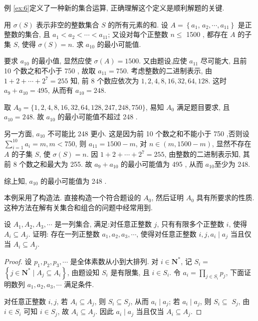 \begin{note}
	例 \ref{ex:6}定义了一种新的集合运算, 正确理解这个定义是顺利解题的关键.
\end{note}

\begin{example}
	用 $\sigma(S)$ 表示非空的整数集合 $S$ 的所有元素的和. 设 $A=\left\{a_{1}\right.$, $\left.a_{2}, \cdots, a_{11}\right\}$ 是正整数的集合, 且 $a_{1}<a_{2}<\cdots<a_{11}$; 又设对每个正整数 $n \leqslant$ 1500 , 都存在 $A$ 的子集 $S$, 使得 $\sigma(S)=n$. 求 $a_{10}$ 的最小可能值.
\end{example}

\begin{analysis}
	要求 $a_{10}$ 的最小值, 显然应使 $\sigma(A)=1500$. 又由题设,应使 $a_{11}$ 尽可能大, 且前 10 个数之和不小于 750 , 故取 $a_{11}=750$. 考虑整数的二进制表示, 由 $1+2+\cdots+2^{7}=255$ 知, 前 8 个数应依次为 $1 ,  2 ,  4 ,  8 ,  16 ,  32 ,  64 ,  128$. 这时 $a_{9}+a_{10}=495$, 从而有 $a_{10}=248$.
\end{analysis}

\begin{solution}
	取 $A_{0}=\{1,2,4,8,16,32,64,128,247,248,750\}$, 易知 $A_{0}$ 满足题目要求, 且 $a_{10}=248$. 故 $a_{10}$ 的最小可能值不超过 248 .

	另一方面, $a_{10}$ 不可能比 248 更小. 这是因为前 10 个数之和不能小于 750 ,否则设 $\sum_{i=1}^{10} a_{i}=m, m<750$, 则 $a_{11}=1500-m$, 对 $n \in(m, 1500-m)$, 显然不存在 $A$ 的子集 $S$, 使 $\sigma(S)=n$. 因 $1+2+\cdots+2^{7}=255$, 由整数的二进制表示知, 其前 8 个数之和最大为 255. 故 $a_{9}+a_{10}$ 的最小可能值为 495 , 从而 $a_{10}$至少为 248.

	综上知, $a_{10}$ 的最小可能值为 248 .
\end{solution}

\begin{note}
	本例采用了构造法. 直接构造一个符合题设的 $A_{0}$, 然后证明 $A_{0}$ 具有所要求的性质. 这种方法在解有关集合和组合的问题中经常用到.
\end{note}

\begin{example}
	设 $A_{1}, A_{2}, A_{3}, \cdots$ 是一列集合, 满足:对任意正整数 $j$, 只有有限多个正整数 $i$, 使得 $A_{i} \subseteq A_{j}$. 证明: 存在一列正整数 $a_{1}, a_{2}, a_{3}, \cdots$, 使得对任意正整数 $i ,  j, a_{i} \mid a_{j}$ 当且仅当 $A_{i} \subseteq A_{j}$.
\end{example}
\begin{proof}
	设 $p_{1}, p_{2}, p_{3}, \cdots$ 是全体素数从小到大排列. 对 $i \in \mathbf{N}^{*}$, 记 $S_{i}=$ $\left\{j \in \mathbf{N}^{*} \mid A_{j} \subseteq A_{i}\right\}$, 由题设知 $S_{i}$ 是有限集, 且 $i \in S_{i}$. 令 $a_{i}=\prod_{j \in S_{i}} p_{j}$, 下面证明数列 $a_{1}, a_{2}, a_{3}, \cdots$ 满足条件.

	对任意正整数 $i ,  j$, 若 $A_{i} \subseteq A_{j}$, 则 $S_{i} \subseteq S_{j}$, 从而 $a_{i} \mid a_{j}$; 若 $a_{i} \mid a_{j}$, 则 $S_{i} \subseteq$ $S_{j}$, 由 $i \in S_{i}$ 可知 $i \in S_{j}$, 故 $A_{i} \subseteq A_{j}$. 因此 $a_{i} \mid a_{j}$ 当且仅当 $A_{i} \subseteq A_{j}$.
\end{proof}

